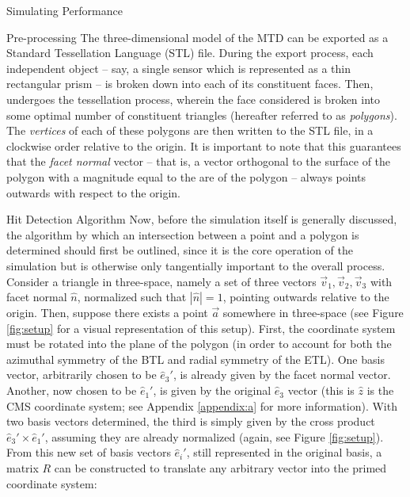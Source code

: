 \begin{section}{Simulating Performance}
\begin{subsection}{Pre-processing}
The three-dimensional model of the MTD can be exported as a Standard Tessellation Language (STL) file. During the export process, each independent object -- say, a single sensor which is represented as a thin rectangular prism -- is broken down into each of its constituent faces. Then, undergoes the tessellation process, wherein the face considered is broken into some optimal number of constituent triangles (hereafter referred to as \textit{polygons}). The \textit{vertices} of each of these polygons are then written to the STL file, in a clockwise order relative to the origin. It is important to note that this guarantees that the \textit{facet normal} vector -- that is, a vector orthogonal to the surface of the polygon with a magnitude equal to the are of the polygon -- always points outwards with respect to the origin.
\end{subsection}
\begin{subsection}{Hit Detection Algorithm}
Now, before the simulation itself is generally discussed, the algorithm by which an intersection between a point and a polygon is determined should first be outlined, since it is the core operation of the simulation but is otherwise only tangentially important to the overall process. Consider a triangle in three-space, namely a set of three vectors $\vec{v}_1, \vec{v}_2, \vec{v}_3$ with facet normal $\hat{n}$, normalized such that $|\hat{n}| = 1$, pointing outwards relative to the origin. Then, suppose there exists a point $\vec{a}$ somewhere in three-space (see Figure \ref{fig:setup} for a visual representation of this setup). First, the coordinate system must be rotated into the plane of the polygon (in order to account for both the azimuthal symmetry of the BTL and radial symmetry of the ETL). One basis vector, arbitrarily chosen to be $\hat{e}_3'$, is already given by the facet normal vector. Another, now chosen to be $\hat{e}_{1}'$, is given by the original $\hat{e}_3$ vector (this is $\hat{z}$ is the CMS coordinate system; see Appendix \ref{appendix:a} for more information). With two basis vectors determined, the third is simply given by the cross product $\hat{e}_3'\times\hat{e}_1'$, assuming they are already normalized (again, see Figure \ref{fig:setup}). From this new set of basis vectors $\hat{e}_i'$, still represented in the original basis, a matrix $R$ can be constructed to translate any arbitrary vector into the primed coordinate system:


\end{subsection}
\end{section}
